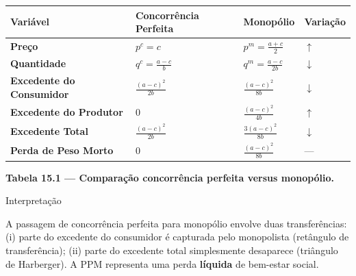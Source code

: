 \documentclass[11pt,twoside,openright]{book}
\begin{document}
{\def\LTcaptype{none} %
\begin{longtable}[]{@{}
  >{\raggedright\arraybackslash}p{}
  >{\raggedright\arraybackslash}p{}
  >{\raggedright\arraybackslash}p{}
  >{\raggedright\arraybackslash}p{}@{}}
\toprule\noalign{}
\begin{minipage}[b]{\linewidth}\raggedright
Variável
\end{minipage} & \begin{minipage}[b]{\linewidth}\raggedright
Concorrência Perfeita
\end{minipage} & \begin{minipage}[b]{\linewidth}\raggedright
Monopólio
\end{minipage} & \begin{minipage}[b]{\linewidth}\raggedright
Variação
\end{minipage} \\
\midrule\noalign{}
\endhead
\bottomrule\noalign{}
\endlastfoot
\textbf{Preço} & \(p^c = c\) & \(p^m = \frac{a+c}{2}\) & \(\uparrow\) \\
\textbf{Quantidade} & \(q^c = \frac{a-c}{b}\) & \(q^m = \frac{a-c}{2b}\)
& \(\downarrow\) \\
\textbf{Excedente do Consumidor} & \(\frac{(a-c)^2}{2b}\) &
\(\frac{(a-c)^2}{8b}\) & \(\downarrow\) \\
\textbf{Excedente do Produtor} & \(0\) & \(\frac{(a-c)^2}{4b}\) &
\(\uparrow\) \\
\textbf{Excedente Total} & \(\frac{(a-c)^2}{2b}\) &
\(\frac{3(a-c)^2}{8b}\) & \(\downarrow\) \\
\textbf{Perda de Peso Morto} & \(0\) & \(\frac{(a-c)^2}{8b}\) & --- \\
\end{longtable}
}

\textbf{Tabela 15.1 --- Comparação concorrência perfeita versus
monopólio.}

\begin{tipbox}{Interpretação}

A passagem de concorrência perfeita para monopólio envolve duas
transferências: (i) parte do excedente do consumidor é capturada pelo
monopolista (retângulo de transferência); (ii) parte do excedente total
simplesmente desaparece (triângulo de Harberger). A PPM representa uma
perda \textbf{líquida} de bem-estar social.

\end{tipbox}
\end{document}
